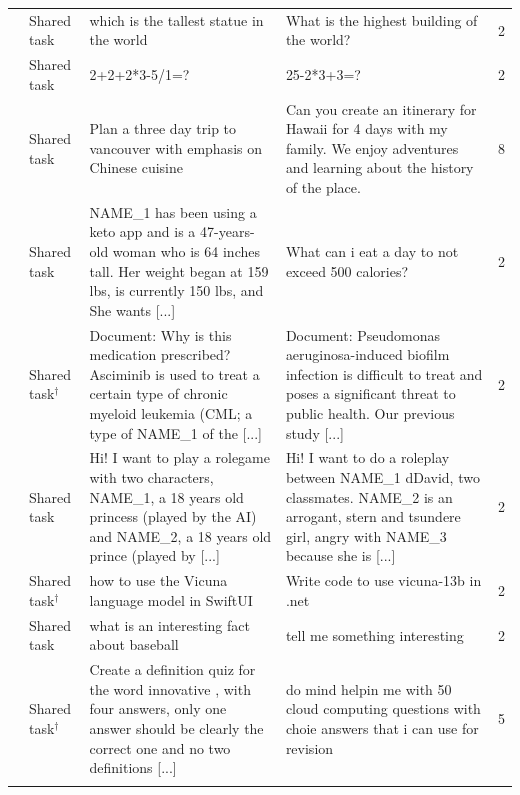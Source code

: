 {\begin{longtable}{@{}p{}p{}p{}p{}p{}@{}}
\addlinespace[3pt]
129 & Shared task & \raggedright which is the tallest statue in the world & \raggedright What is the highest building of the world? & 2\\
\addlinespace[3pt]
279 & Shared task & \raggedright 2+2+2*3-5/1=? & \raggedright 25-2*3+3=? & 2\\
\addlinespace[3pt]
307 & Shared task & \raggedright Plan a three day trip to vancouver with emphasis on Chinese cuisine & \raggedright Can you create an itinerary for Hawaii for 4 days with my family. We enjoy adventures and learning about the history of the place. & 8\\
\addlinespace[3pt]
379 & Shared task & \raggedright NAME\_1 has been using a keto app and is a 47-years-old woman who is 64 inches tall. Her weight began at 159 lbs, is currently 150 lbs, and She wants [...] & \raggedright What can i eat a day to not exceed 500 calories? & 2\\
\addlinespace[3pt]
410 & Shared task$^\dagger$ & \raggedright Document: Why is this medication prescribed? Asciminib is used to treat a certain type of chronic myeloid leukemia (CML; a type of NAME\_1 of the [...] & \raggedright Document: Pseudomonas aeruginosa-induced biofilm infection is difficult to treat and poses a significant threat to public health. Our previous study [...] & 2\\
\addlinespace[3pt]
461 & Shared task & \raggedright Hi! I want to play a rolegame with two characters, NAME\_1, a 18 years old princess (played by the AI) and NAME\_2, a 18 years old prince (played by [...] & \raggedright Hi! I want to do a roleplay between NAME\_1 dDavid, two classmates. NAME\_2 is an arrogant, stern and tsundere girl, angry with NAME\_3 because she is [...] & 2\\
\addlinespace[3pt]
558 & Shared task$^\dagger$ & \raggedright how to use the Vicuna language model in SwiftUI & \raggedright Write code to use vicuna-13b in .net & 2\\
\addlinespace[3pt]
601 & Shared task & \raggedright what is an interesting fact about baseball & \raggedright tell me something interesting & 2\\
\addlinespace[3pt]
810 & Shared task$^\dagger$ & \raggedright Create a definition quiz for the word innovative , with four answers, only one answer should be clearly the correct one and no two definitions [...] & \raggedright do mind helpin me with 50 cloud computing questions with choie answers that i can use for revision & 5\\
\addlinespace[3pt]

\end{longtable}}
